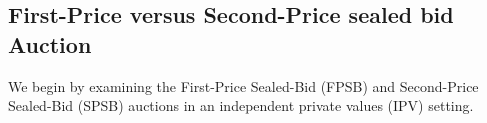 \documentclass{article} %
\newcommand{\TK}[1]{\textcolor{red}{TK: #1}}
\begin{document}





\subsection{First-Price versus Second-Price sealed bid Auction }\label{section:classic}
We begin by examining the First-Price Sealed-Bid (FPSB) and Second-Price Sealed-Bid (SPSB) auctions in an independent private values (IPV) setting. 


\end{document}
